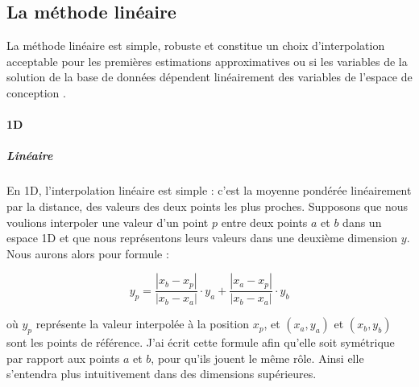 \subsection{La méthode linéaire}
La méthode linéaire est simple, robuste et constitue un choix d'interpolation acceptable pour les premières estimations approximatives ou si les variables de la solution de la base de données dépendent linéairement des variables de l'espace de conception \cite{palmer2009}.


\paragraph{1D}
\vspace{-0.5cm}
\subparagraph{Linéaire}
En 1D, l'interpolation linéaire est simple \cite{fluidssengineer, palmer2009}: c'est la moyenne pondérée linéairement par la distance, des valeurs des deux points les plus proches.
Supposons que nous voulions interpoler une valeur d'un point \( p \) entre deux points \( a \) et \( b \) dans un espace 1D
et que nous représentons leurs valeurs dans une deuxième dimension \( y \).
Nous aurons alors pour formule :

\begin{equation}
y_p = \frac{|x_b - x_p|}{|x_b - x_a|} \cdot y_a + \frac{|x_a - x_p|}{|x_b - x_a|} \cdot y_b
\end{equation}

où \( y_p \) représente la valeur interpolée à la position \( x_p \), et \((x_a, y_a)\) et \((x_b, y_b)\) sont les points de référence. J'ai écrit cette formule afin qu'elle soit symétrique par rapport aux points \( a \) et \( b \), pour qu'ils jouent le même rôle. Ainsi elle s'entendra plus intuitivement dans des dimensions supérieures.
\vspace{0.5cm}

